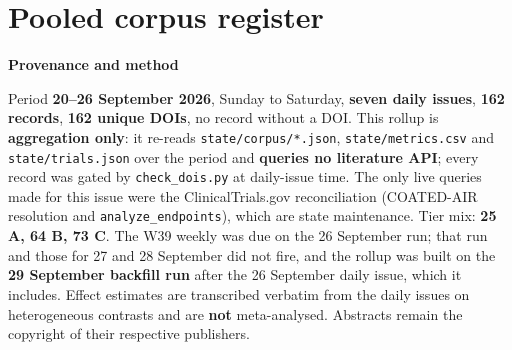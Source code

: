 \documentclass[10pt]{article}
\begin{document}


\section*{\sffamily\bfseries\color{Deep}Pooled corpus register}
\vspace{-1.5mm}{\color{Teal}\rule{\linewidth}{1.1pt}}\vspace{2.5mm}



\vspace{4mm}
\begin{keybox}
{\sffamily\bfseries\footnotesize\color{Deep}Provenance and method}\\[1.2mm]
{\fontsize{7.2}{8.8}\selectfont
Period \textbf{20--26 September 2026}, Sunday to Saturday, \textbf{seven daily issues},
\textbf{162 records}, \textbf{162 unique DOIs}, no record without a DOI. This rollup is
\textbf{aggregation only}: it re-reads \texttt{state/corpus/*.json}, \texttt{state/metrics.csv} and
\texttt{state/trials.json} over the period and \textbf{queries no literature API}; every record was
gated by \texttt{check\_dois.py} at daily-issue time. The only live queries made for this issue were
the ClinicalTrials.gov reconciliation (COATED-AIR resolution and \texttt{analyze\_endpoints}), which
are state maintenance. Tier mix: \textbf{25 A, 64 B, 73 C}. The W39 weekly was due on the 26
September run; that run and those for 27 and 28 September did not fire, and the rollup was built
on the \textbf{29 September backfill run} after the 26 September daily issue, which it includes.
Effect estimates are transcribed verbatim from the daily issues on heterogeneous contrasts and are
\textbf{not} meta-analysed. Abstracts remain the copyright of their respective publishers.\par}
\end{keybox}
\end{document}
